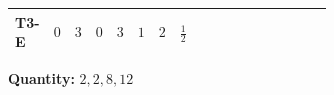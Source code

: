 \documentclass[8pt]{article}
\begin{document}
\begin{landscape}
\begin{longtable}{@{}llcccccc >{\raggedright\arraybackslash}p{0.21\linewidth} >{\raggedright\arraybackslash}p{0.21\linewidth} >{\raggedright\arraybackslash}p{0.21\linewidth}@{}}
T3-E & $0$ & $3$ & $0$ & $3$ & $1$ & $2$ & $\frac{1}{2}$ & \scriptsize\adjustbox{max width=\linewidth}{$\begin{gathered} - \frac{\sqrt{3} lambda12Inv1 \overline{y_{1}} \overline{y_{2}}}{6 MF}\end{gathered}$} & \scriptsize\adjustbox{max width=\linewidth}{$\begin{gathered} \frac{\sqrt{3} g_{1}^{2} \overline{y_{1}} \overline{y_{2}}}{8 MF}\end{gathered}$} & \scriptsize\adjustbox{max width=\linewidth}{$\begin{gathered} \frac{3 \sqrt{11} lambda12Inv2 \overline{y_{1}} \overline{y_{2}}}{22 MF}\end{gathered}$} \\
\midrule
\bottomrule
\end{longtable}
\clearpage
\noindent\textbf{Quantity: }$\mathrm{2,2,8,12}$\par\smallskip

\end{landscape}
\end{document}
